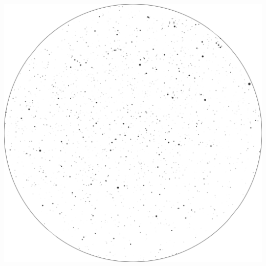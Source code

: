 \documentclass{./SAS-class-skygen}
\begin{document}
	\vspace{0.5cm}
    \begin{center}
    \includegraphics[width=\textwidth]{./pics/skychart36.png}
    \end{center}
    
    
\end{document}
